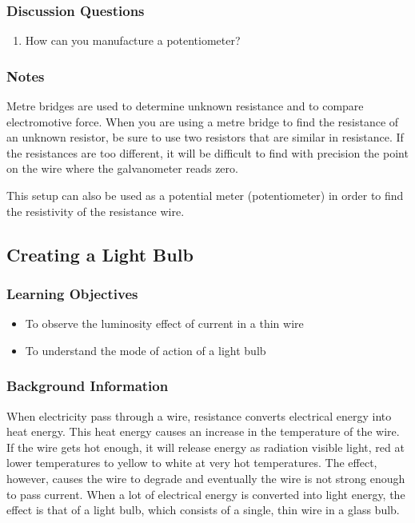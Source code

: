 \subsubsection*{Discussion Questions}
\begin{enumerate}
\item{How can you manufacture a potentiometer?}
\end{enumerate}

\subsubsection*{Notes}
Metre bridges are used to determine unknown resistance and to compare electromotive force.  When you are using a metre bridge to find the resistance of an unknown resistor, be sure to use two resistors that are similar in resistance. If the resistances are too different, it will be difficult to find with precision the point on the wire where the galvanometer reads zero.

This setup can also be used as a potential meter (potentiometer) in order to find the resistivity of the resistance wire.  

\subsection{Creating a Light Bulb}

\subsubsection*{Learning Objectives}
\begin{itemize}
\item{To observe the luminosity effect of current in a thin wire}
\item{To understand the mode of action of a light bulb}
\end{itemize}

\subsubsection*{Background Information}
When electricity pass through a wire, resistance converts electrical energy into heat energy. This heat energy causes an increase in the temperature of the wire. If the wire gets hot enough, it will release energy as radiation visible light, red at lower temperatures to yellow to white at very hot temperatures. The effect, however, causes the wire to degrade and eventually the wire is not strong enough to pass current.  When a lot of electrical energy is converted into light energy, the effect is that of a light bulb, which consists of a single, thin wire in a glass bulb.

